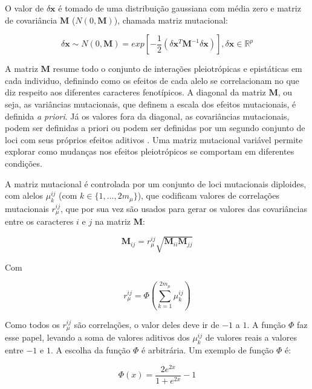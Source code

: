 O valor de $\delta \mathbf{x}$ é tomado de uma distribuição gaussiana com média
zero e matriz de covariância $\mathbf{M}$ ($N(0, \mathbf{M})$), chamada matriz mutacional:

\begin{equation}
    \delta \mathbf{x} \sim N(0, \mathbf{M}) = exp \left[-\frac{1}{2} (\delta \mathbf{x}^T \mathbf{M}^{-1} \delta \mathbf{x})\right] , \delta \mathbf{x} \in \mathbb{R}^p
\end{equation}

A matriz $\mathbf{M}$ resume todo o conjunto de interações pleiotrópicas
e epistáticas em cada individuo, definindo como os efeitos de cada alelo
se correlacionam no que diz respeito aos diferentes caracteres
fenotípicos.
A diagonal da matriz $\mathbf{M}$, ou seja, as variâncias mutacionais, que
definem a escala dos efeitos mutacionais, é definida {\it a priori}.
Já os valores fora da diagonal, as covariâncias mutacionais, podem ser
definidas a priori \citep{Jones2003, Jones2004} ou podem ser definidas
por um segundo conjunto de loci com seus próprios efeitos 
aditivos \citep{Jones2007}.
Uma matriz mutacional variável permite explorar como mudanças nos
efeitos pleiotrópicos se comportam em diferentes condições.

A matriz mutacional é controlada por um conjunto de loci
mutacionais diploides, com alelos $\mu^{ij}_k$ (com $k \in \{1,\ldots,2m_\mu\}$),
que codificam valores de correlações mutacionais $r_\mu^{ij}$, que por
sua vez são usados para gerar os valores das covariâncias entre os
caracteres $i$ e $j$ na matriz $\mathbf{M}$:

\begin{equation}
    \mathbf{M}_{ij} = r_\mu^{ij} \sqrt {\mathbf{M}_{ii}\mathbf{M}_{jj}}
\end{equation}

Com

\begin{equation}
r_\mu^{ij} = \Phi \left(\sum_{k=1}^{2m_\mu} \mu^{ij}_k\right)
\end{equation}

Como todos os $r_\mu^{ij}$ são correlações, o valor deles deve ir de
$-1$ a $1$.
A função $\Phi$ faz esse papel, levando a soma de valores
aditivos dos $\mu^{ij}_k$ de valores reais a valores entre $-1$ e $1$.
A escolha da função $\Phi$ é arbitrária.
Um exemplo de função $\Phi$ \citep[usado em][]{Jones2007} é:

\begin{equation}
\Phi (x) = \frac{2e^{2x}}{1+e^{2x}} - 1
\end{equation}

